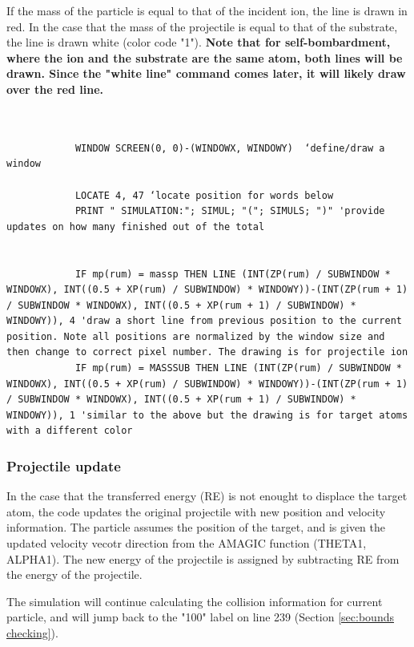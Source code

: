 \documentclass[10pt, reqno]{exam}
\begin{document}
If the mass of the particle is equal to that of the incident ion, the line is drawn in red. In the case that the mass of the projectile is equal to that of the substrate, the line is drawn white (color code "1"). \textbf{Note that for self-bombardment, where the ion and the substrate are the same atom, both lines will be drawn. Since the "white line" command comes later, it will likely draw over the red line.}

\begin{verbatim}   

    
            WINDOW SCREEN(0, 0)-(WINDOWX, WINDOWY)  ‘define/draw a window
    
            LOCATE 4, 47 ‘locate position for words below
            PRINT " SIMULATION:"; SIMUL; "("; SIMULS; ")" 'provide updates on how many finished out of the total

    
            IF mp(rum) = massp THEN LINE (INT(ZP(rum) / SUBWINDOW * WINDOWX), INT((0.5 + XP(rum) / SUBWINDOW) * WINDOWY))-(INT(ZP(rum + 1) / SUBWINDOW * WINDOWX), INT((0.5 + XP(rum + 1) / SUBWINDOW) * WINDOWY)), 4 'draw a short line from previous position to the current position. Note all positions are normalized by the window size and then change to correct pixel number. The drawing is for projectile ion
            IF mp(rum) = MASSSUB THEN LINE (INT(ZP(rum) / SUBWINDOW * WINDOWX), INT((0.5 + XP(rum) / SUBWINDOW) * WINDOWY))-(INT(ZP(rum + 1) / SUBWINDOW * WINDOWX), INT((0.5 + XP(rum + 1) / SUBWINDOW) * WINDOWY)), 1 'similar to the above but the drawing is for target atoms with a different color
\end{verbatim}

\subsubsection{Projectile update}

In the case that the transferred energy (RE) is not enought to displace the target atom, the code updates the original projectile with new position and velocity information. The particle assumes the position of the target, and is given the updated velocity vecotr direction from the AMAGIC function (THETA1, ALPHA1). The new energy of the projectile is assigned by subtracting RE from the energy of the projectile. \par

The simulation will continue calculating the collision information for current particle, and will jump back to the "100" label on line 239 (Section \ref{sec:bounds checking}). 
\end{document}
